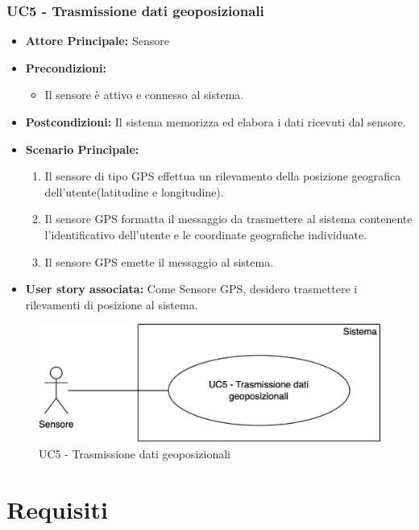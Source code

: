 \documentclass[11pt]{article}
\begin{document}
\begin{justify}
\subsubsection{\textbf{UC5 - Trasmissione dati geoposizionali}}
\begin{itemize}
    \item \textbf{Attore Principale:} Sensore
    \item \textbf{Precondizioni:} 
        \begin{itemize}
    	\item Il sensore è attivo e connesso al sistema.
        \end{itemize}
    \item \textbf{Postcondizioni:} Il sistema memorizza ed elabora i dati ricevuti dal sensore.
    \item \textbf{Scenario Principale:} 
        \begin{enumerate}
            \item Il sensore di tipo GPS effettua un rilevamento della posizione geografica dell'utente(latitudine e longitudine).
            \item Il sensore GPS formatta il messaggio da trasmettere al sistema contenente l’identificativo dell'utente e le coordinate geografiche individuate.
            \item Il sensore GPS emette il messaggio al sistema.
        \end{enumerate}
    \item \textbf{User story associata:} Come Sensore GPS, desidero trasmettere i rilevamenti di posizione al sistema.

\end{itemize}
\begin{figure}[H]
    \centering
    \includegraphics[width=0.5\linewidth]{UC5image.png}
    \caption{UC5 - Trasmissione dati geoposizionali}
    \label{fig:UC5}
\end{figure}


\newpage
\section{Requisiti}


\end{justify}
\end{document}
